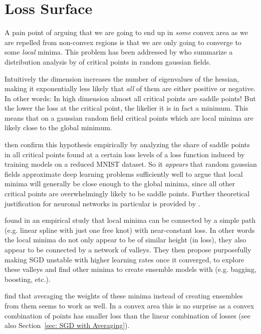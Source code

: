 \section{Loss Surface}\label{sec: loss surface}

A pain point of arguing that we are going to end up in \emph{some} convex area
as we are repelled from non-convex regions is that we are only going to
converge to some \emph{local} minima. This problem has been addressed by
\textcite{pascanuSaddlePointProblem2014} who summarize a distribution analysis
by \textcite{brayStatisticsCriticalPoints2007} of critical points in random
gaussian fields.

Intuitively the dimension increases the number of eigenvalues
of the hessian, making it exponentially less likely that \emph{all} of them are
either positive or negative. In other words: In high dimension almost all
critical points are saddle points! But the lower the loss at the critical point,
the likelier it is in fact a minimum. This means that on a gaussian random field
critical points which are local minima are likely close to the global minimum.

\textcite{pascanuSaddlePointProblem2014}
then confirm this hypothesis empirically by analyzing the share of saddle
points in all critical points found at a certain loss levels of a loss function
induced by training models on a reduced MNIST dataset. So it \emph{appears} that
random gaussian fields approximate deep learning problems sufficiently well to
argue that local minima will generally be close enough to the global minima,
since all other critical points are overwhelmingly likely to be saddle points.
Further theoretical justification for neuronal networks in particular is
provided by \textcite{choromanskaLossSurfacesMultilayer2015}.

\textcite{garipovLossSurfacesMode2018} found in an empirical study that local
minima can be connected by a simple path (e.g. linear spline with just one
free knot) with near-constant loss. In other words the local minima do not only
appear to be of similar height (in loss), they also appear to be connected
by a network of valleys. They then propose purposefully making SGD unstable
with higher learning rates once it converged, to explore these valleys and find
other minima to create ensemble models with (e.g. bagging, boosting, etc.). 

\textcite{izmailovAveragingWeightsLeads2019} find that averaging the weights
of these minima instead of creating ensembles from them seems to work as well.
In a convex area this is no surprise as a convex combination of points
has smaller loss than the linear combination of losses (see also
Section~\ref{sec: SGD with Averaging}).


